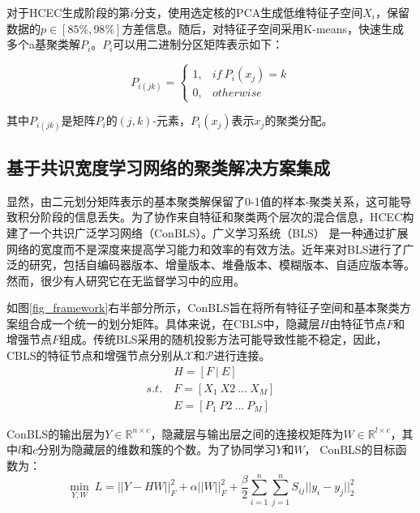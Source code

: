 \documentclass[unicode,pdfcover]{hquthesis}
\begin{document}
对于HCEC生成阶段的第$i$分支，使用选定核的PCA生成低维特征子空间$X_i$，保留数据的$p\in[85\%,98\%]$方差信息。随后，对特征子空间采用K-means，快速生成多个a基聚类解$P_i$。$P_i$可以用二进制分区矩阵表示如下：

\begin{equation}\label{eq_P}
	P_{i(jk)}=\begin{cases}
		1, & if~P_i(x_j)=k \\
		0, & otherwise
	\end{cases}
\end{equation}

其中$P_{i(jk)}$是矩阵$P_i$的$(j,k)$-元素，$P_i(x_j)$表示$x_j$的聚类分配。

\subsection{基于共识宽度学习网络的聚类解决方案集成}
显然，由二元划分矩阵表示的基本聚类解保留了0-1值的样本-聚类关系，这可能导致积分阶段的信息丢失。为了协作来自特征和聚类两个层次的混合信息，HCEC构建了一个共识广泛学习网络（ConBLS）。广义学习系统（BLS） \cite{Chen2017Broad}是一种通过扩展网络的宽度而不是深度来提高学习能力和效率的有效方法。近年来对BLS进行了广泛的研究\cite{Gong2022Research,Zhu2023Distributed}，包括自编码器版本\cite{Yang2021Extracting,yu2023broad}、增量版本\cite{Yang2021Incremental}、堆叠版本\cite{liu2021stacked,Gong2024Cross}、模糊版本\cite{duan2024extreme}、自适应版本\cite{Gong2024CiABL}等。然而，很少有人研究它在无监督学习中的应用。

如图\ref{fig_framework}右半部分所示，ConBLS旨在将所有特征子空间和基本聚类方案组合成一个统一的划分矩阵。具体来说，在CBLS中，隐藏层$H$由特征节点$F$和增强节点$F$组成。传统BLS采用的随机投影方法可能导致性能不稳定，因此，CBLS的特征节点和增强节点分别从$\mathcal{X}$和$\mathcal{P}$进行连接。
\begin{equation}\label{eq_H}
	\begin{aligned}
		& H=[F~|~ E] \\
		s.t.~& F=[X_1~X2~...~X_M] \\
		& E=[P_1~P2~...~P_M]
	\end{aligned}
\end{equation}

ConBLS的输出层为$Y\in \mathbb{R}^{n\times c}$，隐藏层与输出层之间的连接权矩阵为$W\in \mathbb{R}^{l\times c}$，其中$l$和$c$分别为隐藏层的维数和簇的个数。为了协同学习$Y$和$W$， ConBLS的目标函数为：
\begin{equation}
	\min_{Y,W}~L=||Y-HW||^2_F+\alpha ||W||_F^2 + \frac{\beta}{2}\sum_{i=1}^n \sum_{j=1}^n S_{ij}||y_i-y_j||^2_2
\end{equation}
\end{document}

